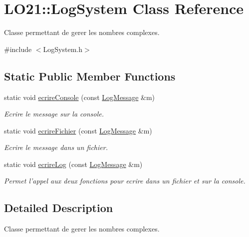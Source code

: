 \hypertarget{class_l_o21_1_1_log_system}{\section{\-L\-O21\-:\-:\-Log\-System \-Class \-Reference}
\label{class_l_o21_1_1_log_system}
}


\-Classe permettant de gerer les nombres complexes.  




{\ttfamily \#include $<$\-Log\-System.\-h$>$}

\subsection*{\-Static \-Public \-Member \-Functions}
\begin{DoxyCompactItemize}
\item 
static void \hyperlink{class_l_o21_1_1_log_system_ad6f5625c05219acbe572b3f0616e943a}{ecrire\-Console} (const \hyperlink{class_l_o21_1_1_log_message}{\-Log\-Message} \&m)
\begin{DoxyCompactList}\small\item\em \-Ecrire le message sur la console. \end{DoxyCompactList}\item 
static void \hyperlink{class_l_o21_1_1_log_system_ad6ad18df1ea2c9cb638ee562dfb76e3d}{ecrire\-Fichier} (const \hyperlink{class_l_o21_1_1_log_message}{\-Log\-Message} \&m)
\begin{DoxyCompactList}\small\item\em \-Ecrire le message dans un fichier. \end{DoxyCompactList}\item 
static void \hyperlink{class_l_o21_1_1_log_system_add7c2d0ae741eab031eb2d362c47274e}{ecrire\-Log} (const \hyperlink{class_l_o21_1_1_log_message}{\-Log\-Message} \&m)
\begin{DoxyCompactList}\small\item\em \-Permet l'appel aux deux fonctions pour ecrire dans un fichier et sur la console. \end{DoxyCompactList}\end{DoxyCompactItemize}


\subsection{\-Detailed \-Description}
\-Classe permettant de gerer les nombres complexes. 

